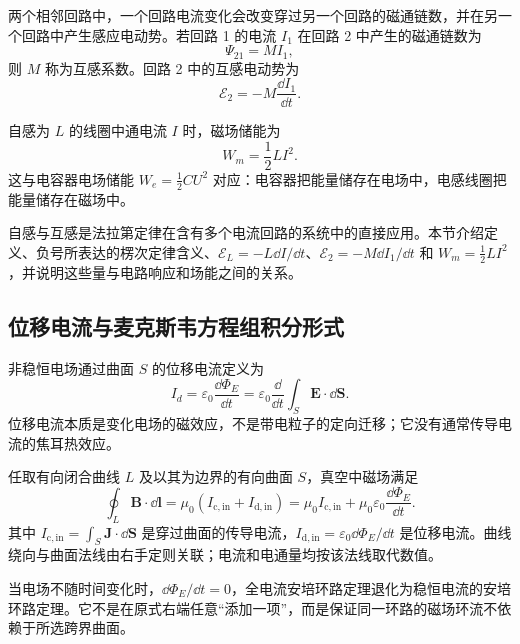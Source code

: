 \begin{definition}[互感]\label{def:mutual-inductance}
两个相邻回路中，一个回路电流变化会改变穿过另一个回路的磁通链数，并在另一个回路中产生感应电动势。若回路 1 的电流 $I_1$ 在回路 2 中产生的磁通链数为
\[
  \Psi_{21}=M I_1,
\]
则 $M$ 称为互感系数。回路 2 中的互感电动势为
\[
  \mathcal E_2=-M\frac{\dd I_1}{\dd t}.
\]
\end{definition}

\begin{definition}[磁场能量与自感]\label{def:inductor-energy}
自感为 $L$ 的线圈中通电流 $I$ 时，磁场储能为
\[
  W_m=\frac12LI^2.
\]
这与电容器电场储能 $W_e=\frac12CU^2$ 对应：电容器把能量储存在电场中，电感线圈把能量储存在磁场中。
\end{definition}

\begin{attention}[自感与互感的学习定位]
自感与互感是法拉第定律在含有多个电流回路的系统中的直接应用。本节介绍定义、负号所表达的楞次定律含义、$\mathcal E_L=-L\dd I/\dd t$、$\mathcal E_2=-M\dd I_1/\dd t$ 和 $W_m=\frac12LI^2$，并说明这些量与电路响应和场能之间的关系。
\end{attention}

\subsection{位移电流与麦克斯韦方程组积分形式}

\begin{definition}[位移电流]\label{def:displacement-current}
非稳恒电场通过曲面 $S$ 的位移电流定义为
\[
  I_d=\varepsilon_0\frac{\dd\Phi_E}{\dd t}
  =\varepsilon_0\frac{\dd}{\dd t}\int_S\bm E\cdot\dd\bm S.
\]
位移电流本质是变化电场的磁效应，不是带电粒子的定向迁移；它没有通常传导电流的焦耳热效应。
\end{definition}

\begin{theorem}[全电流安培环路定理]\label{thm:ampere-maxwell-law}
任取有向闭合曲线 $L$ 及以其为边界的有向曲面 $S$，真空中磁场满足
\[
  \oint_L\bm B\cdot\dd\bm l
  =\mu_0\left(I_{\mathrm{c,in}}+I_{\mathrm{d,in}}\right)
  =\mu_0 I_{\mathrm{c,in}}
  +\mu_0\varepsilon_0\frac{\dd\Phi_E}{\dd t}.
\]
其中 $I_{\mathrm{c,in}}=\int_S\bm J\cdot\dd\bm S$ 是穿过曲面的传导电流，$I_{\mathrm{d,in}}=\varepsilon_0\dd\Phi_E/\dd t$ 是位移电流。曲线绕向与曲面法线由右手定则关联；电流和电通量均按该法线取代数值。
\end{theorem}

当电场不随时间变化时，$\dd\Phi_E/\dd t=0$，全电流安培环路定理退化为稳恒电流的安培环路定理。它不是在原式右端任意“添加一项”，而是保证同一环路的磁场环流不依赖于所选跨界曲面。

